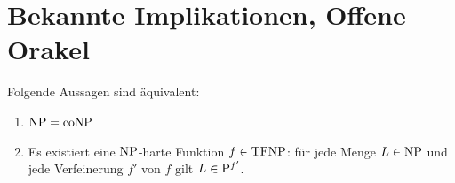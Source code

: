 \section{Bekannte Implikationen, Offene Orakel}

\begin{theorem}\label{thm:tfnp-vs-npconp}
    Folgende Aussagen sind äquivalent:
    \begin{enumerate}
        \item $\NP=\coNP$
        \item Es existiert eine $\NP$-harte Funktion $f\in\TFNP$: für jede Menge $L\in\NP$ und jede Verfeinerung $f'$ von $f$ gilt $L\in\P^{f'}$.
    \end{enumerate}
\end{theorem}

